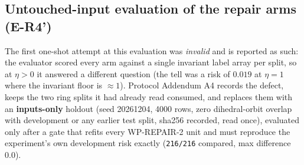 \documentclass[11pt]{article}
\begin{document}
\subsection{Untouched-input evaluation of the repair arms (E-R4')}
\label{sec:er4}

The first one-shot attempt at this evaluation was \emph{invalid} and is reported as such:
the evaluator scored every arm against a single invariant label array per split, so at
$\eta{>}0$ it answered a different question (the tell was a risk of $0.019$ at $\eta{=}1$
where the invariant floor is $\approx1$). Protocol Addendum A4 records the defect, keeps the
two ring splits it had already read consumed, and replaces them with an \textbf{inputs-only}
holdout (seed 20261204, 4000 rows, zero dihedral-orbit overlap with development or any
earlier test split, sha256 recorded, read once), evaluated only after a gate that refits
every WP-REPAIR-2 unit and must reproduce the experiment's own development risk exactly
(\texttt{216/216} compared, max difference $0.0$).
\end{document}
